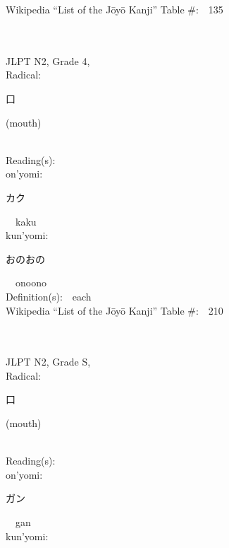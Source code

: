 \begin{multicols}{2}
Wikipedia ``List of the J\=oy\=o Kanji'' Table \#:\ \ 135 \\
\ \ \\
{\fontsize{34pt}{40pt}  }\ \ \\  %
{JLPT N2, Grade 4, \\Radical:\ \ {\begin{CJK}{UTF8}{min} 口 \end{CJK}} (mouth) } \\
Reading(s):\ \ \\
{\hspace*{1em}}on'yomi:\ \ \\
{\hspace*{2em}}{\begin{CJK}{UTF8}{min} カク \end{CJK}}\ \ kaku\ \ \\
{\hspace*{1em}}kun'yomi:\ \ \\
{\hspace*{2em}}{\begin{CJK}{UTF8}{min} おのおの \end{CJK}}\ \ onoono\ \ \\
Definition(s):\ \ each \\
Wikipedia ``List of the J\=oy\=o Kanji'' Table \#:\ \ 210 \\
\ \ \\
{\fontsize{34pt}{40pt}  }\ \ \\  %
{JLPT N2, Grade S, \\Radical:\ \ {\begin{CJK}{UTF8}{min} 口 \end{CJK}} (mouth) } \\
Reading(s):\ \ \\
{\hspace*{1em}}on'yomi:\ \ \\
{\hspace*{2em}}{\begin{CJK}{UTF8}{min} ガン \end{CJK}}\ \ gan\ \ \\
{\hspace*{1em}}kun'yomi:\ \ \\

\end{multicols}
